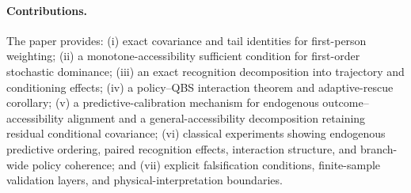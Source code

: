 \paragraph{Contributions.} The paper provides: (i) exact covariance and tail identities for first-person weighting; (ii) a monotone-accessibility sufficient condition for first-order stochastic dominance; (iii) an exact recognition decomposition into trajectory and conditioning effects; (iv) a policy--QBS interaction theorem and adaptive-rescue corollary; (v) a predictive-calibration mechanism for endogenous outcome--accessibility alignment and a general-accessibility decomposition retaining residual conditional covariance; (vi) classical experiments showing endogenous predictive ordering, paired recognition effects, interaction structure, and branch-wide policy coherence; and (vii) explicit falsification conditions, finite-sample validation layers, and physical-interpretation boundaries.
